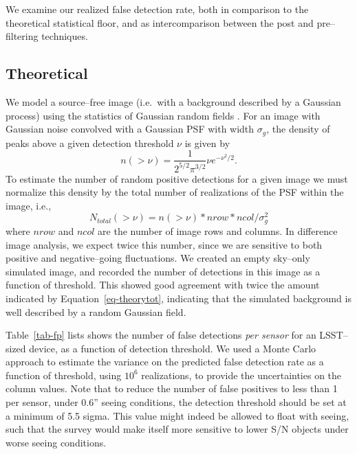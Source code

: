 \documentclass[floatfix, apj]{emulateapj}
\begin{document}
We examine our realized false detection rate, both in comparison to the theoretical statistical floor, and as intercomparison between the post and pre--filtering techniques.

\subsection{Theoretical \label{sec-analyticfp}}

We model a source--free image (i.e.\ with a background described by a Gaussian process) using the statistics of Gaussian random fields \citep{Kaiser-PointSources}.
For an image with Gaussian noise convolved with a Gaussian PSF with width $\sigma_g$, the density of peaks above a given detection threshold $\nu$ is given by
\begin{equation}
n(>\nu) = \frac{1}{2^{5/2}\pi^{3/2}} \nu e^{-\nu^2 /2}.
\label{eq-theory}
\end{equation}
To estimate the number of random positive detections for a given image we must normalize this density by the total number of realizations of the PSF within the image, i.e.,
\begin{equation}
N_{total}(>\nu) = n(>\nu)*nrow*ncol/ \sigma_g^2
\label{eq-theorytot}
\end{equation}
where $nrow$ and $ncol$ are the number of image rows and columns.
In difference image analysis, we expect twice this number, since we are sensitive to both positive and negative--going fluctuations.
We created an empty sky--only simulated image, and recorded the number of detections in this image as a function of threshold.
This showed good agreement with twice the amount indicated by Equation~\ref{eq-theorytot}, indicating that the simulated background is well described by a random Gaussian field.

Table~\ref{tab-fp} lists shows the number of false detections {\it per sensor} for an LSST--sized device, as a function of detection threshold.
We used a Monte Carlo approach to estimate the variance on the predicted false detection rate as a function of threshold, using $10^6$ realizations, to provide the uncertainties on the column values.
Note that to reduce the number of false positives to less than 1 per sensor, under 0.6'' seeing conditions, the detection threshold should be set at a minimum of 5.5 sigma.
This value might indeed be allowed to float with seeing, such that the survey would make itself more sensitive to lower S/N objects under worse seeing conditions.
\end{document}
